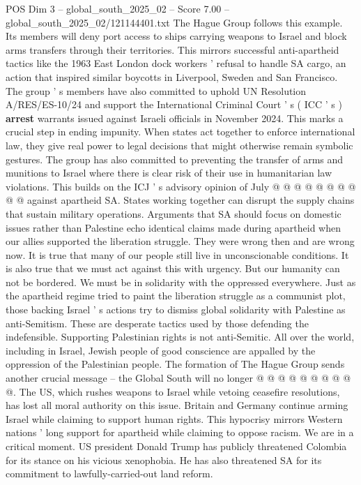 \begin{textsample}{POS Dim 3 – global\_south\_2025\_02 – Score 7.00 – global\_south\_2025\_02/121144401.txt}
The Hague Group follows this example.
Its members will deny port access to ships carrying weapons to Israel and block arms transfers through their territories.
This mirrors successful anti-apartheid tactics like the 1963 East London dock workers ' refusal to handle SA cargo, an action that inspired similar boycotts in Liverpool, Sweden and San Francisco.
The group ' s members have also committed to uphold UN Resolution A/RES/ES-10/24 and support the International Criminal Court ' s ( ICC ' s ) \textbf{arrest} warrants issued against Israeli officials in November 2024.
This marks a crucial step in ending impunity.
When states act together to enforce international law, they give real power to legal decisions that might otherwise remain symbolic gestures.
The group has also committed to preventing the transfer of arms and munitions to Israel where there is clear risk of their use in humanitarian law violations.
This builds on the ICJ ' s advisory opinion of July @ @ @ @ @ @ @ @ @ @ against apartheid SA.
States working together can disrupt the supply chains that sustain military operations.
Arguments that SA should focus on domestic issues rather than Palestine echo identical claims made during apartheid when our allies supported the liberation struggle.
They were wrong then and are wrong now.
It is true that many of our people still live in unconscionable conditions.
It is also true that we must act against this with urgency.
But our humanity can not be bordered.
We must be in solidarity with the oppressed everywhere.
Just as the apartheid regime tried to paint the liberation struggle as a communist plot, those backing Israel ' s actions try to dismiss global solidarity with Palestine as anti-Semitism.
These are desperate tactics used by those defending the indefensible.
Supporting Palestinian rights is not anti-Semitic.
All over the world, including in Israel, Jewish people of good conscience are appalled by the oppression of the Palestinian people.
The formation of The Hague Group sends another crucial message -- the Global South will no longer @ @ @ @ @ @ @ @ @ @.
The US, which rushes weapons to Israel while vetoing ceasefire resolutions, has lost all moral authority on this issue.
Britain and Germany continue arming Israel while claiming to support human rights.
This hypocrisy mirrors Western nations ' long support for apartheid while claiming to oppose racism.
We are in a critical moment.
US president Donald Trump has publicly threatened Colombia for its stance on his vicious xenophobia.
He has also threatened SA for its commitment to lawfully-carried-out land reform.

\end{textsample}
